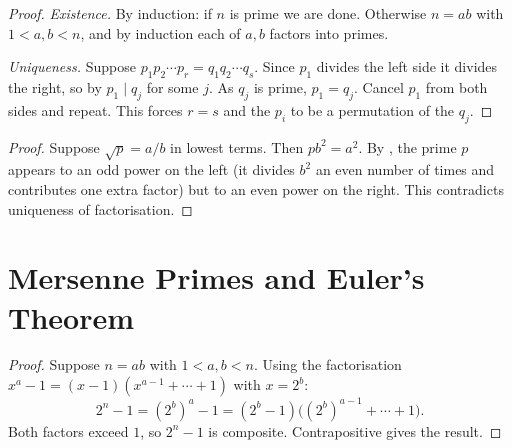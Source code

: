 \documentclass{report}
\begin{document}

\begin{proof}
	\textit{Existence.}
	By induction: if $n$ is prime we are done.  Otherwise $n = ab$ with
	$1 < a,b < n$, and by induction each of $a,b$ factors into primes.

	\textit{Uniqueness.}
	Suppose $p_1 p_2 \cdots p_r = q_1 q_2 \cdots q_s$.  Since $p_1$
	divides the left side it divides the right, so by
	 $p_1 \mid q_j$ for some $j$.  As $q_j$ is
	prime, $p_1 = q_j$.  Cancel $p_1$ from both sides and repeat.
	This forces $r = s$ and the $p_i$ to be a permutation of the $q_j$.
\end{proof}


\begin{proof}
	Suppose $\sqrt{p} = a/b$ in lowest terms.  Then $pb^2 = a^2$.  By
	, the prime $p$ appears to an odd power on the left
	(it divides $b^2$ an even number of times and contributes one extra
	factor) but to an even power on the right.  This contradicts
	uniqueness of factorisation.
\end{proof}


\section{Mersenne Primes and Euler's Theorem}



\begin{proof}
	Suppose $n = ab$ with $1 < a,b < n$.  Using the factorisation
	$x^a - 1 = (x-1)(x^{a-1}+\cdots+1)$ with $x = 2^b$:
	\[
		2^n - 1 = (2^b)^a - 1 = (2^b - 1)\bigl((2^b)^{a-1} + \cdots + 1\bigr).
	\]
	Both factors exceed $1$, so $2^n - 1$ is composite.  Contrapositive
	gives the result.
\end{proof}
\end{document}

